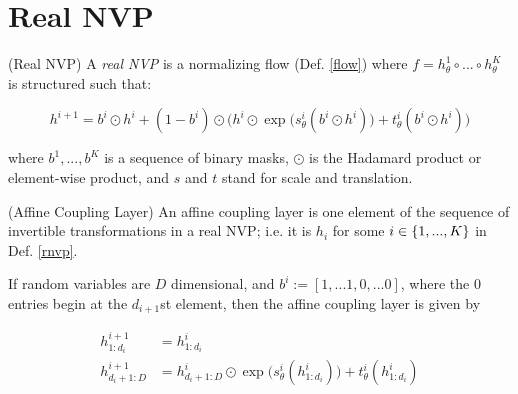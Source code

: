 \documentclass[10pt]{beamer}
\begin{document}
%
%



\section{Real NVP}

\begin{definition}{(Real NVP)} \label{rnvp}
A \textit{real NVP} is a normalizing flow (Def. \ref{flow}) where $f=h_\theta^1 \circ ... \circ h_\theta^K$ is structured such that:

\[h^{i+1} = b^i \odot h^i + (1-b^i) \odot \bigg( h^i \odot \exp \big( s^i_\theta(b^i \odot h^i) \big) + t^i_\theta(b^i \odot h^i) \bigg)  \]
 
where $b^1, ..., b^K$ is a sequence of binary masks, $\odot$ is the Hadamard product or element-wise product, and $s$ and $t$ stand for scale and translation. %
\end{definition}


\begin{definition}{(Affine Coupling Layer)} \label{acl}
An affine coupling layer is one element of the sequence of invertible transformations in a real NVP; i.e. it is $h_i$ for some $i \in \{ {1,...,K} \}$ in Def. \ref{rnvp}. 
\end{definition}

\begin{example}\label{rnvp_example}

If random variables are $D$ dimensional, and $b^i := [1,... 1, 0,...0]$, where the 0 entries begin at the $d_{i+1}$st element, then the affine coupling layer is given by

\begin{align*}
h^{i+1}_{1:d_i} &= h^i_{1:d_i} \\
h^{i+1}_{d_i+1:D} &= h^i_{d_i+1:D} \odot \exp \big( s^i_\theta(h^i_{1:d_i}) \big) + t^i_\theta(h^i_{1:d_i})  \\
\end{align*}


\end{example}
\end{document}
